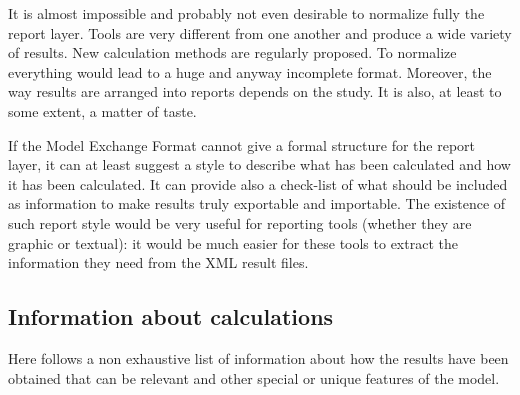 \documentclass[11pt]{article}
\begin{document}
It is almost impossible and probably not even desirable to normalize
fully the report layer. Tools are very different from one another and
produce a wide variety of results. New calculation methods are regularly
proposed. To normalize everything would lead to a huge and anyway
incomplete format. Moreover, the way results are arranged into reports
depends on the study. It is also, at least to some extent, a matter of
taste.

If the Model Exchange Format cannot give a formal structure for the
report layer, it can at least suggest a style to describe what has been
calculated and how it has been calculated. It can provide also a
check-list of what should be included as information to make results
truly exportable and importable. The existence of such report style
would be very useful for reporting tools (whether they are graphic or
textual): it would be much easier for these tools to extract the
information they need from the XML result files.

\subsection{Information about calculations}
\label{sec:orgb2b652d}

Here follows a non exhaustive list of information about how the results
have been obtained that can be relevant and other special or unique
features of the model.
\end{document}

